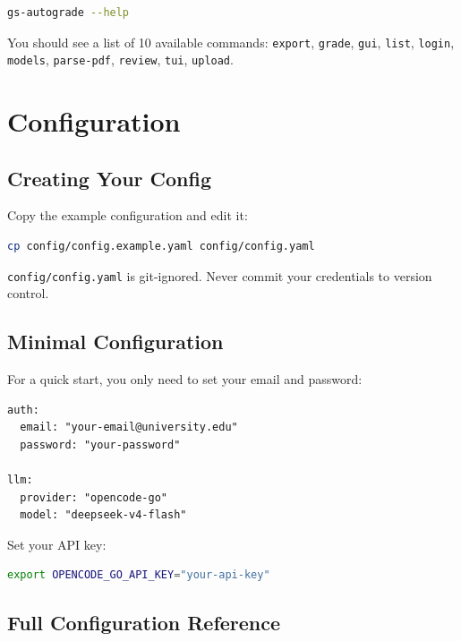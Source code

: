 \documentclass[11pt,a4paper]{article}
\begin{document}
\begin{lstlisting}[language=bash]
gs-autograde --help
\end{lstlisting}

You should see a list of 10 available commands: \texttt{export}, \texttt{grade}, \texttt{gui}, \texttt{list}, \texttt{login}, \texttt{models}, \texttt{parse-pdf}, \texttt{review}, \texttt{tui}, \texttt{upload}.

\section{Configuration}

\subsection{Creating Your Config}

Copy the example configuration and edit it:

\begin{lstlisting}[language=bash]
cp config/config.example.yaml config/config.yaml
\end{lstlisting}

\begin{warnbox}
\texttt{config/config.yaml} is git-ignored. Never commit your credentials to version control.
\end{warnbox}

\subsection{Minimal Configuration}

For a quick start, you only need to set your email and password:

\begin{lstlisting}[style=yamlstyle]
auth:
  email: "your-email@university.edu"
  password: "your-password"

llm:
  provider: "opencode-go"
  model: "deepseek-v4-flash"
\end{lstlisting}

Set your API key:

\begin{lstlisting}[language=bash]
export OPENCODE_GO_API_KEY="your-api-key"
\end{lstlisting}

\subsection{Full Configuration Reference}
\end{document}
